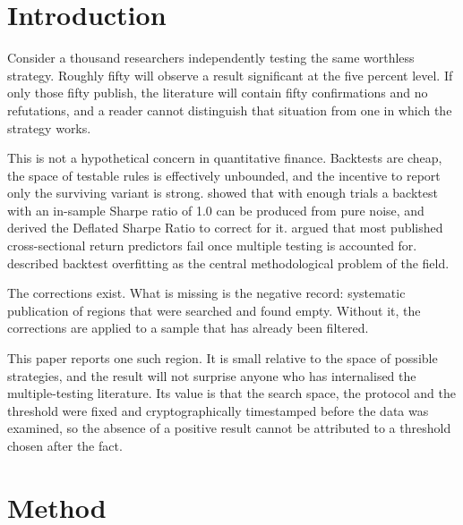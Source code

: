 \documentclass[11pt,a4paper]{article}
\begin{document}
\begin{abstract}
The contribution is not a claim that technical trading does not work. It is a
mapped region of strategy space with a stated detection limit, published
whether or not it contained anything, together with the timestamps that let a
third party verify the pre-registration independently of the author. Every
sweep, including the eight that were voided and the reasons for voiding them,
is reported in the appendix.
\end{abstract}

\section{Introduction}

Consider a thousand researchers independently testing the same worthless
strategy. Roughly fifty will observe a result significant at the five percent
level. If only those fifty publish, the literature will contain fifty
confirmations and no refutations, and a reader cannot distinguish that
situation from one in which the strategy works.

This is not a hypothetical concern in quantitative finance. Backtests are
cheap, the space of testable rules is effectively unbounded, and the incentive
to report only the surviving variant is strong. \citet{bailey2014} showed that
with enough trials a backtest with an in-sample Sharpe ratio of 1.0 can be
produced from pure noise, and derived the Deflated Sharpe Ratio to correct for
it. \citet{harvey2016} argued that most published cross-sectional return
predictors fail once multiple testing is accounted for.
\citet{lopezdeprado2018} described backtest overfitting as the central
methodological problem of the field.

The corrections exist. What is missing is the negative record: systematic
publication of regions that were searched and found empty. Without it, the
corrections are applied to a sample that has already been filtered.

This paper reports one such region. It is small relative to the space of
possible strategies, and the result will not surprise anyone who has
internalised the multiple-testing literature. Its value is that the search
space, the protocol and the threshold were fixed and cryptographically
timestamped before the data was examined, so the absence of a positive result
cannot be attributed to a threshold chosen after the fact.

\section{Method}
\end{document}
